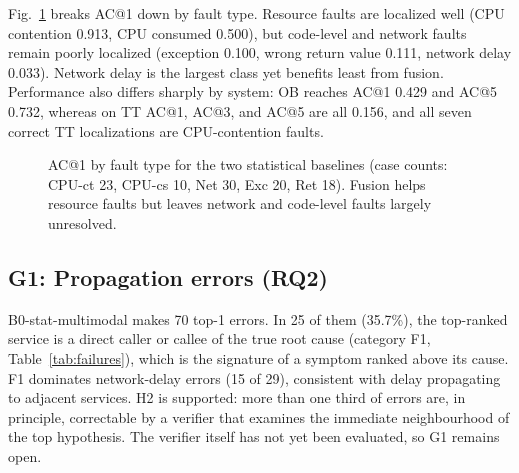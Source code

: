 \documentclass[conference]{IEEEtran}
\begin{document}
Fig.~\ref{fig:perfault} breaks AC@1 down by fault type. Resource faults are localized well (CPU contention 0.913, CPU consumed 0.500), but code-level and network faults remain poorly localized (exception 0.100, wrong return value 0.111, network delay 0.033). Network delay is the largest class yet benefits least from fusion. Performance also differs sharply by system: OB reaches AC@1 0.429 and AC@5 0.732, whereas on TT AC@1, AC@3, and AC@5 are all 0.156, and all seven correct TT localizations are CPU-contention faults.

\begin{figure}[t]
\centering
{}
\caption{AC@1 by fault type for the two statistical baselines (case counts: CPU-ct 23, CPU-cs 10, Net 30, Exc 20, Ret 18). Fusion helps resource faults but leaves network and code-level faults largely unresolved.}
\label{fig:perfault}
\end{figure}

\subsection{G1: Propagation errors (RQ2)}
B0-stat-multimodal makes 70 top-1 errors. In 25 of them (35.7\%), the top-ranked service is a direct caller or callee of the true root cause (category F1, Table~\ref{tab:failures}), which is the signature of a symptom ranked above its cause. F1 dominates network-delay errors (15 of 29), consistent with delay propagating to adjacent services. H2 is supported: more than one third of errors are, in principle, correctable by a verifier that examines the immediate neighbourhood of the top hypothesis. The verifier itself has not yet been evaluated, so G1 remains open.
\end{document}

